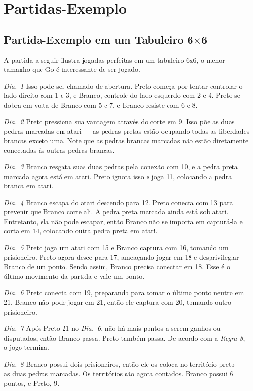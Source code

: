 \chapter{Partidas-Exemplo}\label{chap:cinco}

\section{Partida-Exemplo em um Tabuleiro \texorpdfstring{6$\times$6}{6x6}}

A partida a seguir ilustra jogadas perfeitas em um tabuleiro 6x6, o menor tamanho que Go é interessante de ser jogado.

\emph{Dia.\@~1} Isso pode ser chamado de abertura. Preto começa por tentar controlar o lado direito com 1 e 3, e Branco, controle do lado esquerdo com 2 e 4. Preto se dobra em volta de Branco com 5 e 7, e Branco resiste com 6 e 8.

\emph{Dia.\@~2} Preto pressiona sua vantagem através do corte em 9. Isso põe as duas pedras marcadas em atari --- as pedras pretas estão ocupando todas as liberdades brancas exceto uma. Note que as pedras brancas marcadas não estão diretamente conectadas às outras pedras brancas.

\emph{Dia.\@~3} Branco resgata suas duas pedras pela conexão com 10, e a pedra preta marcada agora está em atari. Preto ignora isso e joga 11, colocando a pedra branca em atari.

\emph{Dia.\@~4} Branco escapa do atari descendo para 12. Preto conecta com 13 para prevenir que Branco corte ali. A pedra preta marcada ainda está sob atari. Entretanto, ela não pode escapar, então Branco não se importa em capturá-la e corta em 14, colocando outra pedra preta em atari.

\emph{Dia.\@~5} Preto joga um atari com 15 e Branco captura com 16, tomando um prisioneiro. Preto agora desce para 17, ameaçando jogar em 18 e desprivilegiar Branco de um ponto. Sendo assim, Branco precisa conectar em 18. Esse é o último movimento da partida e vale um ponto.

\emph{Dia.\@~6} Preto conecta com 19, preparando para tomar o último ponto neutro em 21. Branco não pode jogar em 21, então ele captura com 20, tomando outro prisioneiro.

\emph{Dia.\@~7} Após Preto 21 no \emph{Dia.\@~6}, não há mais pontos a serem ganhos ou disputados, então Branco passa. Preto também passa. De acordo com a \emph{Regra 8}, o jogo termina.

\emph{Dia.\@~8} Branco possui dois prisioneiros, então ele os coloca no território preto --- as duas pedras marcadas. Os territórios são agora contados. Branco possui 6 pontos, e Preto, 9.

